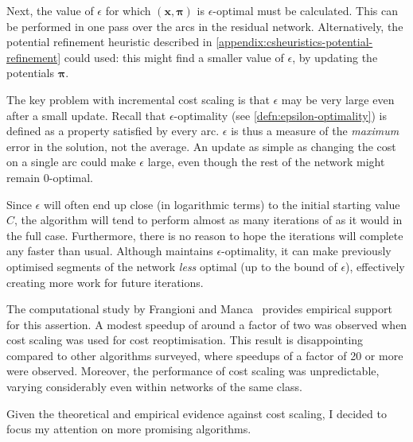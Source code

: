 Next, the value of $\epsilon$ for which $\left(\mathbf{x},\boldsymbol{\pi}\right)$ is $\epsilon$-optimal must be calculated. This can be performed in one pass over the arcs in the residual network\footnotemark. Alternatively, the potential refinement heuristic described in \cref{appendix:csheuristics-potential-refinement} could used: this might find a smaller value of $\epsilon$, by updating the potentials $\boldsymbol{\pi}$.

The key problem with incremental cost scaling is that $\epsilon$ may be very large even after a small update. Recall that $\epsilon$-optimality (see \cref{defn:epsilon-optimality}) is defined as a property satisfied by every arc. $\epsilon$ is thus a measure of the \emph{maximum} error in the solution, not the average. An update as simple as changing the cost on a single arc could make $\epsilon$ large, even though the rest of the network might remain $0$-optimal.

Since $\epsilon$ will often end up close (in logarithmic terms) to the initial starting value $C$, the algorithm will tend to perform almost as many iterations of  as it would in the full case. Furthermore, there is no reason to hope the iterations will complete any faster than usual. Although  maintains $\epsilon$-optimality, it can make previously optimised segments of the network \emph{less} optimal (up to the bound of $\epsilon$), effectively creating more work for future iterations.

The computational study by Frangioni and Manca~\cite{Frangioni:2006} provides empirical support for this assertion. A modest speedup of around a factor of two was observed when cost scaling was used for cost reoptimisation. This result is disappointing compared to other algorithms surveyed, where speedups of a factor of 20 or more were observed. Moreover, the performance of cost scaling was unpredictable, varying considerably even within networks of the same class.

Given the theoretical and empirical evidence against cost scaling, I decided to focus my attention on more promising algorithms.

